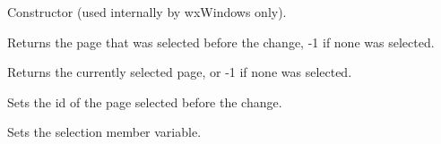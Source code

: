 Constructor (used internally by wxWindows only).

\label{wxnotebookeventgetoldselection}


Returns the page that was selected before the change, -1 if none was selected.

\label{wxnotebookeventgetselection}


Returns the currently selected page, or -1 if none was selected.

\label{wxnotebookeventsetoldselection}


Sets the id of the page selected before the change.

\label{wxnotebookeventsetselection}


Sets the selection member variable.




